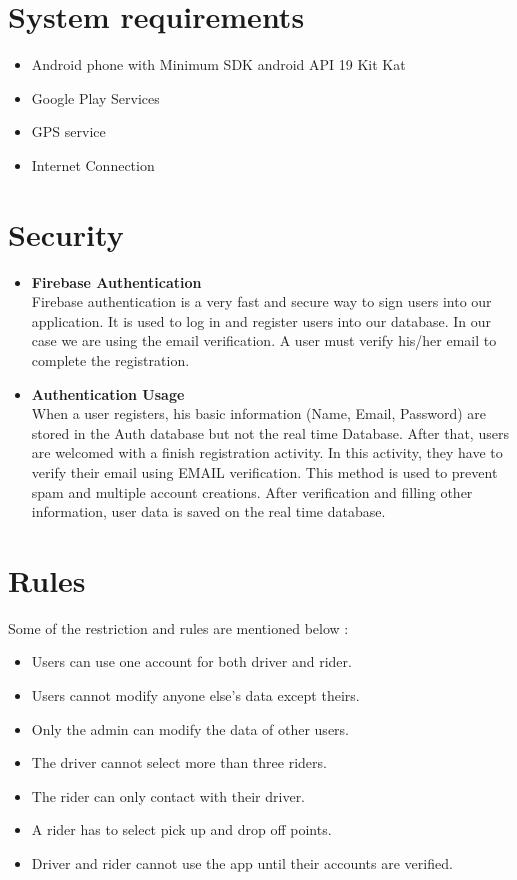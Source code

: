\section{System requirements}
\begin{itemize}
\item Android phone with Minimum SDK android API 19 Kit Kat 
\item Google Play Services
\item GPS service
\item Internet Connection
\end{itemize}

\section{Security}
\begin{itemize}
\item \textbf{Firebase Authentication}\\ 

Firebase authentication is a very fast and secure way to sign users into our application. It is used to log in and register users into our database. In our case we are using the email verification. A user must verify his/her email to complete the registration.

\item \textbf{Authentication Usage}\\

When a user registers, his basic information (Name, Email, Password) are stored in the Auth database but not the real time Database. After that, users are welcomed with a finish registration activity. In this activity, they have to verify their email using EMAIL verification. This method is used to prevent spam and multiple account creations. After verification and filling other information, user data is saved on the real time database. 
\end{itemize}

\section{Rules}
Some of the restriction and rules are mentioned below :
\begin{itemize}
\item Users can use one account for both driver and rider.
\item Users cannot modify anyone else's data except theirs.
\item Only the admin can modify the data of other users.
\item The driver cannot select more than three riders.
\item The rider can only contact with their driver.
\item A rider has to select pick up and drop off points.
\item Driver and rider cannot use the app until their accounts are verified.
\end{itemize}
